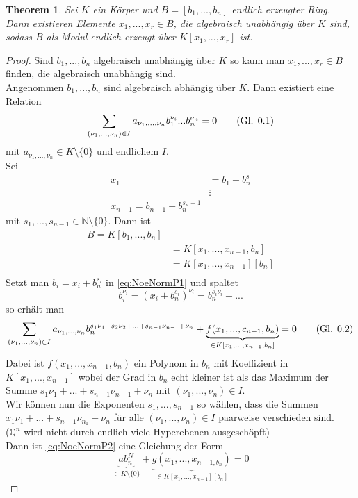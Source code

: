 \documentclass[10pt,a4paper]{article}
\newcommand{\autotag}{\stepcounter{equation}\tag{Gl. \arabic{section}.\arabic{equation}}}
\newcommand{\N}{\ensuremath{\mathbb{N}}}
\newcommand{\Q}{\ensuremath{\mathbb{Q}}}
\theoremstyle{plain}
\newtheorem{theorem}{Theorem}[section]
\theoremstyle{definition}
\theoremstyle{remark}
\begin{document}
	\begin{theorem}\label{satz:501NeoNorm}
		Sei $K$ ein Körper und $B=[b_1,...,b_n]$ endlich erzeugter Ring. Dann existieren Elemente $x_1,...,x_r\in B$, die algebraisch unabhängig über $K$ sind, sodass $B$ als Modul endlich erzeugt über $K[x_1,...,x_r]$ ist.
	\end{theorem}
	\begin{proof}
		Sind $b_1,...,b_n$ algebraisch unabhängig über $K$ so kann man $x_1,...,x_r\in B$ finden, die algebraisch unabhängig sind.\\
		Angenommen $b_1,...,b_n$ sind algebraisch abhängig über $K$. Dann existiert eine Relation
		\[\sum_{(\nu_1,...,\nu_n)\in I}a_{\nu_1,...,\nu_n}b_1^{\nu_i}...b_n^{\nu_n}=0\autotag\label{eq:NoeNormP1}\]
		mit $a_{\nu_1,...,\nu_n}\in K\setminus\{0\}$ und endlichem $I$.\\
		Sei
		\begin{align*}
		x_1&=b_1-b_n^{s}\\
		&\vdots\\
		x_{n-1}=b_{n-1}-b_n^{s_n-1}
		\end{align*}
		mit $s_1,...,s_{n-1}\in\N\setminus\{0\}$. Dann ist
		\begin{align*}
		B=K[b_1,...,b_n]\\
		&=K[x_1,...,x_{n-1},b_n]\\
		&=K[x_1,...,x_{n-1}][b_n]\\
		\end{align*}
		Setzt man $b_i=x_i+b_n^{s_i}$ in \ref{eq:NoeNormP1} und spaltet
		\[b_i^{\nu_i}=(x_i+b_n^{s_i})^{\nu_i}=b_n^{s_i\nu_i}+...\]
		so erhält man
		\[\sum_{(\nu_1,...,\nu_n)\in I} a_{\nu_1,...,\nu_n}b_n^{s_1\nu_1+s_2\nu_2+...+s_{n-1}\nu_{n-1}+\nu_n}+\underbrace{f(x_1,...,c_{n-1},b_n)}_{\in K[x_1,...,x_{n-1},b_n]}=0\autotag\label{eq:NoeNormP2}\]
		Dabei ist $f(x_1,...,x_{n-1},b_n)$ ein Polynom in $b_n$ mit Koeffizient in $K[x_1,...,x_{n-1}]$ wobei der Grad in $b_n$ echt kleiner ist als das Maximum der Summe $s_1\nu_1+...+s_{n-1}\nu_{n-1}+\nu_n$ mit $(\nu_1,...,\nu_n)\in I$.\\
		Wir können nun die Exponenten $s_1,...,s_{n-1}$ so wählen, dass die Summen $x_1\nu_1+...+s_{n-1}\nu_{n_1}+\nu_n$ für alle $(\nu_1,...,\nu_n)\in I$ paarweise verschieden sind.\\
		($\Q^n$ wird nicht durch endlich viele Hyperebenen ausgeschöpft)\\
		Dann ist \ref{eq:NoeNormP2} eine Gleichung der Form
		\[\underbrace{ab_n^{N}}_{\in K\setminus\{0\}}+\underbrace{g(x_1,...,x_{n-1,b_n})}_{\in K[x_1,...,x_{n-1}][b_n]}=0\]

\end{proof}
\end{document}
